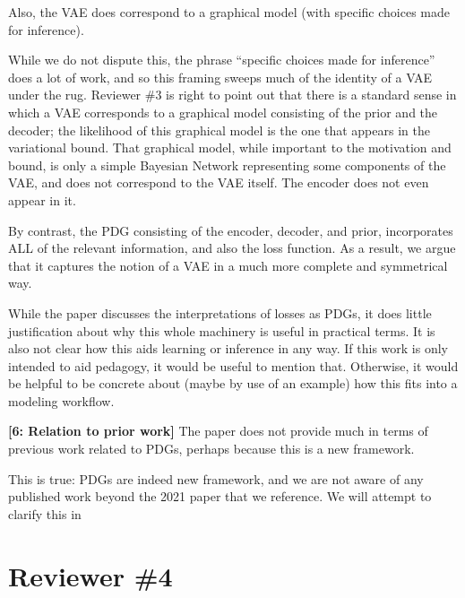 
\begin{reviewer says}
    Also, the VAE does correspond to a graphical model (with specific choices made for inference).
\end{reviewer says}

While we do not dispute this,
the phrase ``specific choices made for inference'' does a lot of work, and so this framing sweeps much of the identity of a VAE under the rug.
Reviewer \#3 is right to point out that there is a standard sense in which a VAE corresponds to a graphical model consisting of the prior and the decoder; the likelihood of this graphical model is the one that appears in the variational bound.
That graphical model, while important to the motivation and bound, is only a simple Bayesian Network representing some components of the VAE, and does not correspond to the VAE itself.
The encoder does not even appear in it.

By contrast, the PDG consisting of the encoder, decoder, and prior, incorporates ALL of the relevant information, and also the loss function.
As a result, we argue that it captures the notion of a VAE in a much more complete and symmetrical way.


\begin{reviewer says}
    While the paper discusses the interpretations of losses as PDGs, it does little justification about why this whole machinery is useful in practical terms. It is also not clear how this aids learning or inference in any way. If this work is only intended to aid pedagogy, it would be useful to mention that. Otherwise, it would be helpful to be concrete about (maybe by use of an example) how this fits into a modeling workflow.
\end{reviewer says}


\begin{reviewer says}
    \textbf{[6: Relation to prior work]} The paper does not provide much in terms of previous work related to PDGs, perhaps because this is a new framework.
\end{reviewer says}

This is true: PDGs are indeed new framework, and we are not aware of any published work beyond the 2021 paper that we reference.  We will attempt to clarify this in


\section*{Reviewer \#4}

